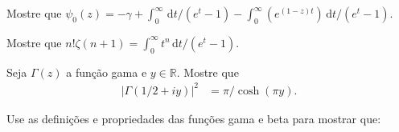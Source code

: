 \documentclass[a4paper,12pt, leqno, answers]{exam}
\begin{document}
\begin{questions}
    \question Mostre que $\psi_0(z) = -\gamma + \int_0^\infty \,\mathrm{d}t / \left( e^t - 1 \right) - \int_0^\infty \left( e^{\left( 1 - z \right) t} \right) \,\mathrm{d}t / \left( e^t - 1 \right)$.
    \begin{solution}
    \end{solution}

    \question Mostre que $n! \zeta(n + 1) = \int_0^\infty t^n \,\mathrm{d}t / \left( e^t - 1 \right)$.
    \begin{solution}
    \end{solution}

    \question[P2 de 2006] Seja $\Gamma(z)$ a fun\c{c}\~{a}o gama e $y \in \mathbb{R}$. Mostre que
    \begin{align*}
        \left| \Gamma(1/2 + i y) \right|^2 &= \pi / \cosh(\pi y).
    \end{align*}
    \begin{solution}
    \end{solution}

    \question[T4 de 2011] Use as defini\c{c}\~{o}es e propriedades das fun\c{c}\~{o}es gama e beta para mostrar que:
\end{questions}
\end{document}
